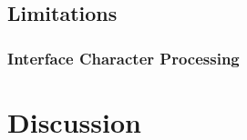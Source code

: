 \documentclass[12pt,twoside]{report} %
\begin{document}
	\section{Limitations} \label{sec:limitations}

	\subsection{Interface Character Processing} \label{sec:interface-character-processing}

	\chapter{Discussion} \label{discussion}

	\appendix



	

	
\end{document}
